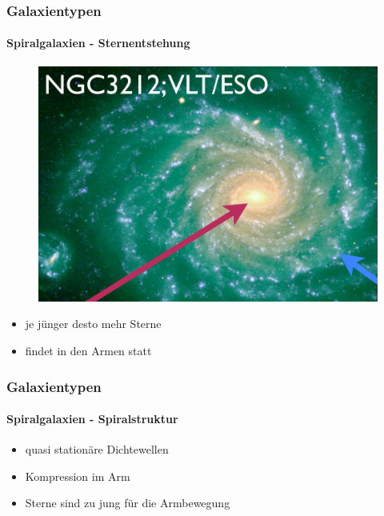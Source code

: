 \begin{frame}
\frametitle{Galaxientypen}
\framesubtitle{Spiralgalaxien - Sternentstehung}

\begin{figure}
\includegraphics[scale=0.25]{Sternentstehung_Spirale.png}
\end{figure}

\begin{itemize}
\item je jünger desto mehr Sterne
\item findet in den Armen statt
\end{itemize}

\end{frame}


\begin{frame}
\frametitle{Galaxientypen}
\framesubtitle{Spiralgalaxien - Spiralstruktur}


\begin{itemize}
\item quasi stationäre Dichtewellen 
\item Kompression im Arm
\item Sterne sind zu jung für die Armbewegung
\end{itemize}




\end{frame}


